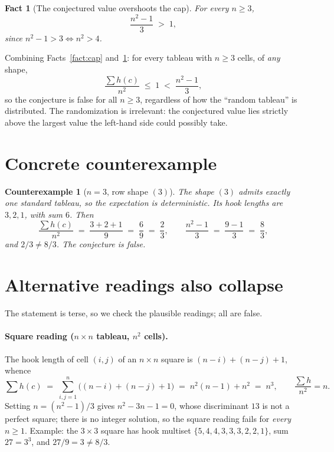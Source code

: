 \documentclass[11pt]{article}
\newtheorem{fact}{Fact}
\newtheorem{counterexample}{Counterexample}
\begin{document}
\begin{fact}[The conjectured value overshoots the cap]\label{fact:overshoot}
For every $n \ge 3$,
\[
\frac{n^2-1}{3} \;>\; 1,
\]
since $n^2 - 1 > 3 \iff n^2 > 4$.
\end{fact}

Combining Facts~\ref{fact:cap} and~\ref{fact:overshoot}: for every tableau with
$n \ge 3$ cells, of \emph{any} shape,
\[
\frac{\sum h(c)}{n^2} \;\le\; 1 \;<\; \frac{n^2-1}{3},
\]
so the conjecture is false for all $n \ge 3$, regardless of how the
``random tableau'' is distributed. The randomization is irrelevant: the
conjectured value lies strictly above the largest value the left-hand side could
possibly take.

\section{Concrete counterexample}

\begin{counterexample}[$n = 3$, row shape $(3)$]\label{ex:row}
The shape $(3)$ admits exactly one standard tableau, so the expectation is
deterministic. Its hook lengths are $3, 2, 1$, with sum $6$. Then
\[
\frac{\sum h(c)}{n^2} \;=\; \frac{3+2+1}{9} \;=\; \frac{6}{9} \;=\; \frac{2}{3},
\qquad
\frac{n^2-1}{3} \;=\; \frac{9-1}{3} \;=\; \frac{8}{3},
\]
and $2/3 \ne 8/3$. The conjecture is false.
\end{counterexample}

\section{Alternative readings also collapse}

The statement is terse, so we check the plausible readings; all are false.

\paragraph{Square reading ($n \times n$ tableau, $n^2$ cells).}
The hook length of cell $(i,j)$ of an $n \times n$ square is
$(n-i)+(n-j)+1$, whence
\[
\sum h(c) \;=\; \sum_{i,j=1}^{n}\bigl((n-i)+(n-j)+1\bigr)
\;=\; n^2(n-1) + n^2 \;=\; n^3,
\qquad
\frac{\sum h}{n^2} = n .
\]
Setting $n = (n^2-1)/3$ gives $n^2 - 3n - 1 = 0$, whose discriminant $13$ is not
a perfect square; there is no integer solution, so the square reading fails for
\emph{every} $n \ge 1$. Example: the $3\times 3$ square has hook multiset
$\{5,4,4,3,3,3,2,2,1\}$, sum $27 = 3^3$, and $27/9 = 3 \ne 8/3$.
\end{document}
